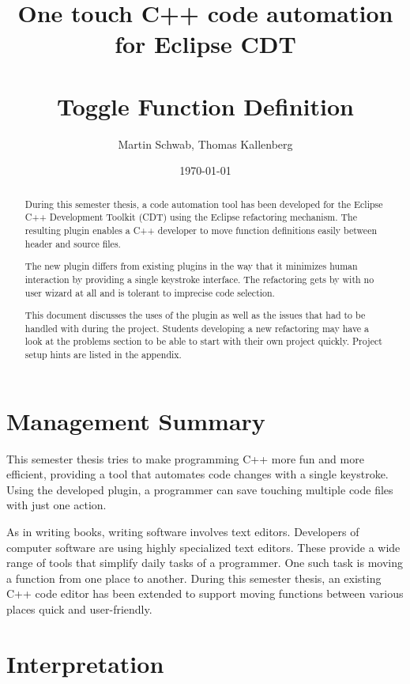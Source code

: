\documentclass[a4paper,12pt]{scrreprt}
\title{One touch C++ code automation for Eclipse CDT \\ ~ \\ 
\normalsize{Toggle Function Definition} }
\date{\today}
\author{Martin Schwab, Thomas Kallenberg}
\begin{document}
\maketitle
{}

\begin{abstract}
\thispagestyle{empty}
During this semester thesis, a code automation tool has been developed for the 
Eclipse C++ Development Toolkit (CDT) using the Eclipse refactoring mechanism. 
The resulting plugin enables a C++ developer to move function definitions easily 
between header and source files.

The new plugin differs from existing plugins in the way that it minimizes human 
interaction by providing a single keystroke interface. The refactoring gets by 
with no user wizard at all and is tolerant to imprecise code selection. 

This document discusses the uses of the plugin as well as the issues that had 
to be handled with during the project. Students developing a new refactoring may 
have a look at the problems section to be able to start with their own project 
quickly. Project setup hints are listed in the appendix.
\end{abstract}

\chapter*{Management Summary}
This semester thesis tries to make programming C++ more fun and more efficient, 
providing a tool that automates code changes with a single keystroke. Using the 
developed plugin, a programmer can save touching multiple code files with just 
one action.

As in writing books, writing software involves text editors. Developers of 
computer software are using highly specialized text editors. These provide a 
wide range of tools that simplify daily tasks of a programmer. One such task is 
moving a function from one place to another. During this semester thesis, an 
existing C++ code editor has been extended to support moving functions between 
various places quick and user-friendly.
\thispagestyle{empty}

\tableofcontents
\thispagestyle{empty}





\chapter{Interpretation}
\thispagestyle{fancy}
\end{document}
